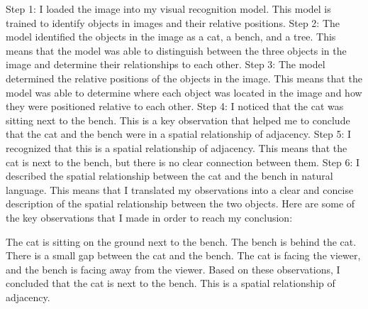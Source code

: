 \begin{enumerate}
\begin{enumerate}
        Step 1: I loaded the image into my visual recognition model. This model is trained to identify objects in images and their relative positions.
        Step 2: The model identified the objects in the image as a cat, a bench, and a tree. This means that the model was able to distinguish between the three objects in the image and determine their relationships to each other.
        Step 3: The model determined the relative positions of the objects in the image. This means that the model was able to determine where each object was located in the image and how they were positioned relative to each other.
        Step 4: I noticed that the cat was sitting next to the bench. This is a key observation that helped me to conclude that the cat and the bench were in a spatial relationship of adjacency.
        Step 5: I recognized that this is a spatial relationship of adjacency. This means that the cat is next to the bench, but there is no clear connection between them.
        Step 6: I described the spatial relationship between the cat and the bench in natural language. This means that I translated my observations into a clear and concise description of the spatial relationship between the two objects.
        Here are some of the key observations that I made in order to reach my conclusion:
        
        The cat is sitting on the ground next to the bench.
        The bench is behind the cat.
        There is a small gap between the cat and the bench.
        The cat is facing the viewer, and the bench is facing away from the viewer.
        Based on these observations, I concluded that the cat is next to the bench. This is a spatial relationship of adjacency.
        

\end{enumerate}
\end{enumerate}
